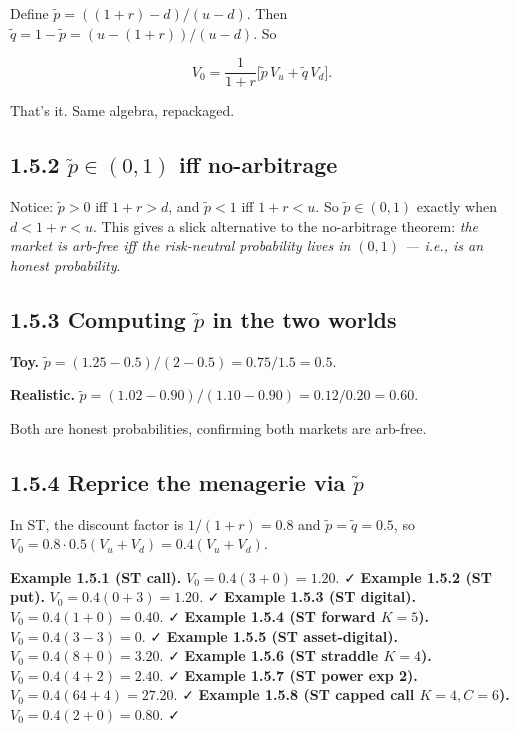 \documentclass[
  10pt,
  twoside]{book}
\begin{document}
Define \(\tilde p = ((1+r)-d)/(u-d)\). Then
\(\tilde q = 1 - \tilde p = (u-(1+r))/(u-d)\). So

\[V_0 = \frac{1}{1+r}\bigl[\tilde p\,V_u + \tilde q\,V_d\bigr].\]

That's it. Same algebra, repackaged.

\subsection{\texorpdfstring{1.5.2 \(\tilde p\in(0,1)\) iff
no-arbitrage}{1.5.2 \textbackslash tilde p\textbackslash in(0,1) iff no-arbitrage}}\label{tilde-pin01-iff-no-arbitrage}

Notice: \(\tilde p>0\) iff \(1+r>d\), and \(\tilde p<1\) iff \(1+r<u\).
So \(\tilde p\in(0,1)\) exactly when \(d<1+r<u\). This gives a slick
alternative to the no-arbitrage theorem: \emph{the market is arb-free
iff the risk-neutral probability lives in \((0,1)\) --- i.e., is an
honest probability}.

\subsection{\texorpdfstring{1.5.3 Computing \(\tilde p\) in the two
worlds}{1.5.3 Computing \textbackslash tilde p in the two worlds}}\label{computing-tilde-p-in-the-two-worlds}

\textbf{Toy.} \(\tilde p = (1.25-0.5)/(2-0.5) = 0.75/1.5 = 0.5\).

\textbf{Realistic.}
\(\tilde p = (1.02-0.90)/(1.10-0.90) = 0.12/0.20 = 0.60\).

Both are honest probabilities, confirming both markets are arb-free.

\subsection{\texorpdfstring{1.5.4 Reprice the menagerie via
\(\tilde p\)}{1.5.4 Reprice the menagerie via \textbackslash tilde p}}\label{reprice-the-menagerie-via-tilde-p}

In ST, the discount factor is \(1/(1+r)=0.8\) and
\(\tilde p=\tilde q=0.5\), so
\(V_0=0.8\cdot 0.5(V_u+V_d) = 0.4(V_u+V_d)\).

\textbf{Example 1.5.1 (ST call).} \(V_0=0.4(3+0)=1.20\). ✓
\textbf{Example 1.5.2 (ST put).} \(V_0=0.4(0+3)=1.20\). ✓
\textbf{Example 1.5.3 (ST digital).} \(V_0=0.4(1+0)=0.40\). ✓
\textbf{Example 1.5.4 (ST forward \(K=5\)).} \(V_0=0.4(3-3)=0\). ✓
\textbf{Example 1.5.5 (ST asset-digital).} \(V_0=0.4(8+0)=3.20\). ✓
\textbf{Example 1.5.6 (ST straddle \(K=4\)).} \(V_0=0.4(4+2)=2.40\). ✓
\textbf{Example 1.5.7 (ST power exp 2).} \(V_0=0.4(64+4)=27.20\). ✓
\textbf{Example 1.5.8 (ST capped call \(K=4,C=6\)).}
\(V_0=0.4(2+0)=0.80\). ✓
\end{document}
